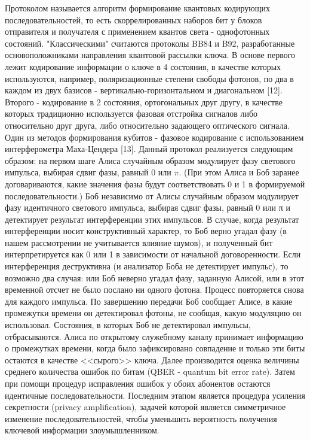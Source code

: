 Протоколом называется алгоритм формирование квантовых кодирующих последовательностей, то есть скоррелированных наборов бит у блоков отправителя и получателя с применением квантов света - однофотонных состояний. "Классическими"  считаются протоколы BB84 и B92, разработанные основоположниками направления квантовой рассылки ключа. В основе первого лежит кодирование информации о ключе в 4 состояния, в качестве которых используются, например, поляризационные степени свободы фотонов, по два в каждом из двух базисов - вертикально-горизонтальном и диагональном [12]. Второго - кодирование в 2 состояния, ортогональных друг другу, в качестве которых традиционно используется фазовая отстройка сигналов либо относительно друг друга, либо относительно задающего оптического сигнала. Один из методов формирования кубитов - фазовое кодирование с использованием интерферометра Маха-Цендера [13]. Данный протокол реализуется следующим образом: на первом шаге Алиса случайным образом модулирует фазу светового импульса, выбирая сдвиг фазы, равный 0 или $\pi$. (При этом Алиса и Боб заранее договариваются, какие значения фазы будут соответствовать 0 и 1 в формируемой последовательности.) Боб независимо от Алисы случайным образом модулирует фазу идентичного светового импульса, выбирая сдвиг фазы, равный 0 или π и детектирует результат интерференции этих импульсов. В случае, когда результат интерференции носит конструктивный характер, то Боб верно угадал фазу (в нашем рассмотрении не учитывается влияние шумов), и полученный бит интерпретируется как 0 или 1 в зависимости от начальной договоренности. Если интерференция деструктивна (и анализатор Боба не детектирует импульс), то возможно два случая: или Боб неверно угадал фазу, заданную Алисой, или в этот временной отсчет не было послано ни одного фотона. Процесс повторяется снова для каждого импульса. По завершению передачи Боб сообщает Алисе, в какие промежутки времени он детектировал фотоны, не сообщая, какую модуляцию он использовал. Состояния, в которых Боб не детектировал импульсы, отбрасываются. Алиса по открытому служебному каналу принимает информацию о промежутках времени, когда было зафиксировано совпадение и только эти биты остаются в качестве <<сырого>> ключа. Далее производится оценка величины среднего количества ошибок по битам (QBER - quantum bit error rate). Затем при помощи процедур исправления ошибок у обоих абонентов остаются идентичные последовательности. Последним этапом является процедура усиления секретности (privacy amplification), задачей которой является симметричное изменение последовательностей, чтобы уменьшить вероятность получения ключевой информации злоумышленником.


